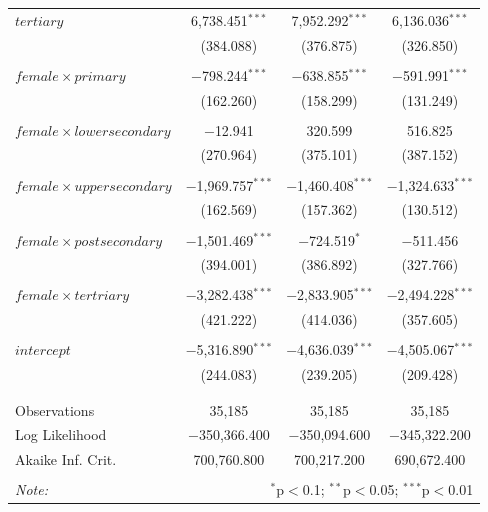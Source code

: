 \documentclass[a4paper]{article}\usepackage[]{graphicx}\usepackage[]{color}
\begin{document}
\begin{table}[H]
\begin{tabular}{@{\extracolsep{5pt}}lccc}
 $tertiary$ & 6,738.451$^{***}$ & 7,952.292$^{***}$ & 6,136.036$^{***}$ \\ 
  & (384.088) & (376.875) & (326.850) \\ 
  & & & \\ 
 $female \times primary$ & $-$798.244$^{***}$ & $-$638.855$^{***}$ & $-$591.991$^{***}$ \\ 
  & (162.260) & (158.299) & (131.249) \\ 
  & & & \\ 
 $female \times lower secondary$ & $-$12.941 & 320.599 & 516.825 \\ 
  & (270.964) & (375.101) & (387.152) \\ 
  & & & \\ 
 $female \times upper secondary$ & $-$1,969.757$^{***}$ & $-$1,460.408$^{***}$ & $-$1,324.633$^{***}$ \\ 
  & (162.569) & (157.362) & (130.512) \\ 
  & & & \\ 
 $female \times post secondary$ & $-$1,501.469$^{***}$ & $-$724.519$^{*}$ & $-$511.456 \\ 
  & (394.001) & (386.892) & (327.766) \\ 
  & & & \\ 
 $female \times tertriary$ & $-$3,282.438$^{***}$ & $-$2,833.905$^{***}$ & $-$2,494.228$^{***}$ \\ 
  & (421.222) & (414.036) & (357.605) \\ 
  & & & \\ 
 $intercept$ & $-$5,316.890$^{***}$ & $-$4,636.039$^{***}$ & $-$4,505.067$^{***}$ \\ 
  & (244.083) & (239.205) & (209.428) \\ 
  & & & \\ 
\hline \\[-1.8ex] 
Observations & 35,185 & 35,185 & 35,185 \\ 
Log Likelihood & $-$350,366.400 & $-$350,094.600 & $-$345,322.200 \\ 
Akaike Inf. Crit. & 700,760.800 & 700,217.200 & 690,672.400 \\ 
\hline 
\hline \\[-1.8ex] 
\textit{Note:}  & \multicolumn{3}{r}{$^{*}$p$<$0.1; $^{**}$p$<$0.05; $^{***}$p$<$0.01} \\ 
\end{tabular} 
\end{table} 
\end{document}
